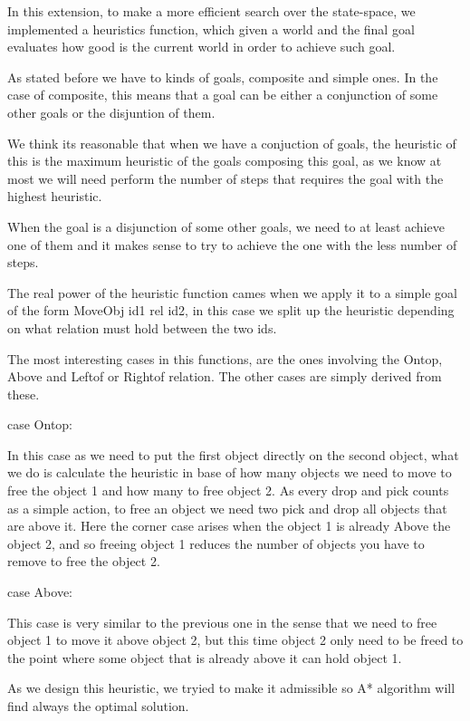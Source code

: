 In this extension, to make a more efficient search over the state-space, we implemented
a heuristics function, which given a world and the final goal evaluates how good is the
current world in order to achieve such goal.

As stated before we have to kinds of goals, composite and simple ones. In the case of
composite, this means that a goal can be either a conjunction of some other goals or 
the disjuntion of them.

We think its reasonable that when we have a conjuction of goals, the heuristic of this
is the maximum heuristic of the goals composing this goal, as we know at most we will need
perform the number of steps that requires the goal with the highest heuristic.

When the goal is a disjunction of some other goals, we need to at least achieve one of them and it makes sense to try to achieve the one with the less number of steps.

The real power of the heuristic function cames when we apply it to a simple goal of the form
MoveObj id1 rel id2, in this case we split up the heuristic depending on what relation 
must hold between the two ids.
  
The most interesting cases in this functions, are the ones involving the Ontop, Above and Leftof or Rightof relation. The other cases are simply derived from these.

case Ontop:

In this case as we need to put the first object directly on the second object, what we do is
calculate the heuristic in base of how many objects we need to move to free the object 1
and how many to free object 2. As every drop and pick counts as a simple action, to free an object we need two pick and drop all objects that are above it. Here the corner case arises when the object 1 is already Above the object 2, and so freeing object 1 reduces the number of objects you have to remove to free the object 2.

case Above:

This case is very similar to the previous one in the sense that we need to free object 1 to 
move it above object 2, but this time object 2 only need to be freed to the point where 
some object that is already above it can hold object 1.

As we design this heuristic, we tryied to make it admissible so A* algorithm will find always
the optimal solution.
